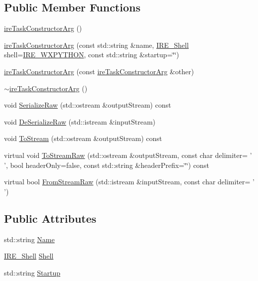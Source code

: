 \subsection*{Public Member Functions}
\begin{DoxyCompactItemize}
\item 
\hyperlink{classire_task_constructor_arg_ab88df56e75650d8ada2319db7351a1da}{ire\-Task\-Constructor\-Arg} ()
\item 
\hyperlink{classire_task_constructor_arg_a2279dd80928d6ef42b481a0ec298373c}{ire\-Task\-Constructor\-Arg} (const std\-::string \&name, \hyperlink{ire_task_8h_acf351b6707399f614eed953a7c0c0d9a}{I\-R\-E\-\_\-\-Shell} shell=\hyperlink{ire_task_8h_acf351b6707399f614eed953a7c0c0d9aa659bffb40eea456bffe6e139d3d15477}{I\-R\-E\-\_\-\-W\-X\-P\-Y\-T\-H\-O\-N}, const std\-::string \&startup=\char`\"{}\char`\"{})
\item 
\hyperlink{classire_task_constructor_arg_a0f935b87bd289a21e47c5437b4bbb818}{ire\-Task\-Constructor\-Arg} (const \hyperlink{classire_task_constructor_arg}{ire\-Task\-Constructor\-Arg} \&other)
\item 
\hyperlink{classire_task_constructor_arg_a1f9fa7a23dde779a9d67f052bd8677ab}{$\sim$ire\-Task\-Constructor\-Arg} ()
\item 
void \hyperlink{classire_task_constructor_arg_a638be7d9bc220b864885f30c4c53aa9d}{Serialize\-Raw} (std\-::ostream \&output\-Stream) const 
\item 
void \hyperlink{classire_task_constructor_arg_ac203b279ff922fb6161399a654402a29}{De\-Serialize\-Raw} (std\-::istream \&input\-Stream)
\item 
void \hyperlink{classire_task_constructor_arg_a53f6578aef2b7665b1e5dee0ee39711c}{To\-Stream} (std\-::ostream \&output\-Stream) const 
\item 
virtual void \hyperlink{classire_task_constructor_arg_a5418e8c1dfd71d99f789b615c9eed5d6}{To\-Stream\-Raw} (std\-::ostream \&output\-Stream, const char delimiter= ' ', bool header\-Only=false, const std\-::string \&header\-Prefix=\char`\"{}\char`\"{}) const 
\item 
virtual bool \hyperlink{classire_task_constructor_arg_a0538948d639995adef2f35d01f1aa93a}{From\-Stream\-Raw} (std\-::istream \&input\-Stream, const char delimiter= ' ')
\end{DoxyCompactItemize}
\subsection*{Public Attributes}
\begin{DoxyCompactItemize}
\item 
std\-::string \hyperlink{classire_task_constructor_arg_acdf26b246ab025d372e37d4dd177dc22}{Name}
\item 
\hyperlink{ire_task_8h_acf351b6707399f614eed953a7c0c0d9a}{I\-R\-E\-\_\-\-Shell} \hyperlink{classire_task_constructor_arg_a5235380c8daceb769828415ebdec263e}{Shell}
\item 
std\-::string \hyperlink{classire_task_constructor_arg_ac3551e515c358cec7e4c193d120dbd3f}{Startup}
\end{DoxyCompactItemize}


